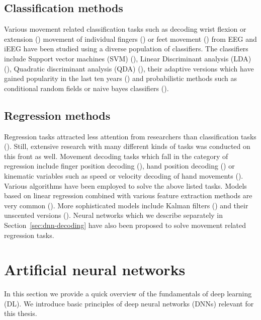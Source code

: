 \subsection{Classification methods}
Various movement related classification tasks such as decoding wrist flexion or extension (\cite{wrist-flexion}) movement of individual fingers (\cite{cond-rf-finger-class, lda-finger-movement-classification}) or feet movement (\cite{feet-movement}) from EEG and iEEG have been studied using a diverse population of classifiers.  
The classifiers include Support vector machines (SVM) (\cite{svm-alg}), Linear Discriminant analysis (LDA) (\cite{lda-paper}), Quadratic discriminant analysis (QDA) (\cite{qda-paper}), their adaptive versions which have gained popularity in the last ten years (\cite{lotte2018review}) and probabilistic methods such as conditional random fields or naive bayes classifiers (\cite{bayesian-decoding, cond-rf-finger-class}). 


\subsection{Regression methods}
Regression tasks attracted less attention from researchers than classification tasks (\cite{volkova-review}).
Still, extensive research with many different kinds of tasks was conducted on this front as well.
Movement decoding tasks which fall in the category of regression include finger position decoding (\cite{Pistohl2008PredictionOA}), hand position decoding (\cite{ball-2019}) or
kinematic variables such as speed or velocity decoding of hand movements (\cite{hammer-role-2013, hammer-predominance-2016, Hammer-2021, kalman-filters-velocity, linear-regression-eeg-hand-3d}).
Various algorithms have been employed to solve the above listed tasks. 
Models based on linear regression combined with various feature extraction methods are very common (\cite{hammer-role-2013, hammer-predominance-2016, eeg-hand-moving, linear-regression-eeg-hand-3d}).
More sophisticated models include Kalman filters (\cite{kalman-filters-velocity}) and their unscented versions (\cite{uns-kalman-filters-gait-decoding}).
Neural networks which we describe separately in Section~\ref{sec:dnn-decoding} have also been proposed to solve movement related regression tasks.

\section{Artificial neural networks}\label{sec:artificial-neural-networks}
In this section we provide a quick overview of the fundamentals of deep learning (DL). 
We introduce basic principles of deep neural networks (DNNs) relevant for this thesis.


